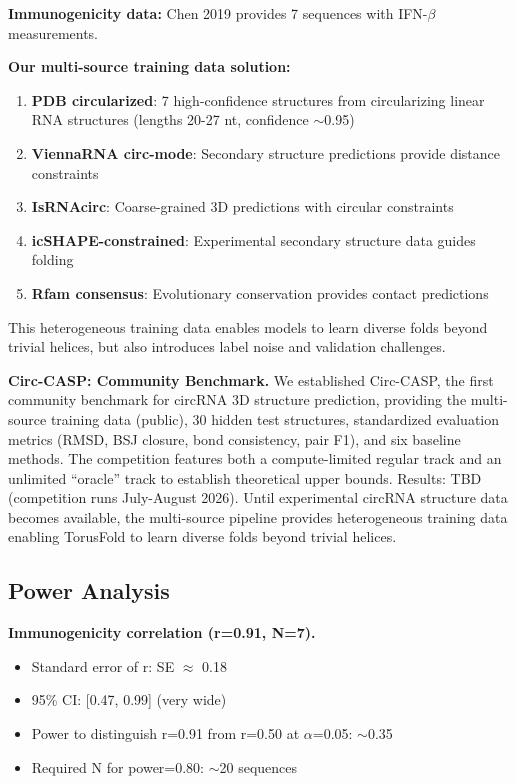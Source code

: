 \documentclass[12pt]{article}
\begin{document}
\textbf{Immunogenicity data:} Chen 2019 provides 7 sequences with IFN-$\beta$ measurements.

\textbf{Our multi-source training data solution:}

\begin{enumerate}
\item \textbf{PDB circularized}: 7 high-confidence structures from circularizing linear RNA structures (lengths 20-27 nt, confidence $\sim$0.95)

\item \textbf{ViennaRNA circ-mode}: Secondary structure predictions provide distance constraints

\item \textbf{IsRNAcirc}: Coarse-grained 3D predictions with circular constraints

\item \textbf{icSHAPE-constrained}: Experimental secondary structure data guides folding

\item \textbf{Rfam consensus}: Evolutionary conservation provides contact predictions
\end{enumerate}

This heterogeneous training data enables models to learn diverse folds beyond trivial helices, but also introduces label noise and validation challenges.

\textbf{Circ-CASP: Community Benchmark.} We established Circ-CASP, the first community benchmark for circRNA 3D structure prediction, providing the multi-source training data (public), 30 hidden test structures, standardized evaluation metrics (RMSD, BSJ closure, bond consistency, pair F1), and six baseline methods. The competition features both a compute-limited regular track and an unlimited ``oracle'' track to establish theoretical upper bounds. Results: TBD (competition runs July-August 2026). Until experimental circRNA structure data becomes available, the multi-source pipeline provides heterogeneous training data enabling TorusFold to learn diverse folds beyond trivial helices.

\subsection{Power Analysis}

\textbf{Immunogenicity correlation (r=0.91, N=7).}
\begin{itemize}
\item Standard error of r: SE $\approx$ 0.18
\item 95\% CI: [0.47, 0.99] (very wide)
\item Power to distinguish r=0.91 from r=0.50 at $\alpha$=0.05: $\sim$0.35
\item Required N for power=0.80: $\sim$20 sequences
\end{itemize}
\end{document}
